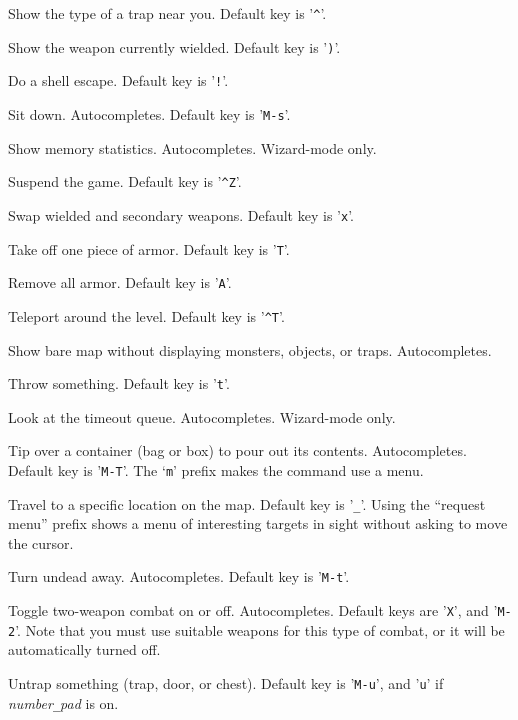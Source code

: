 \item[\tb{\#seetrap}]
Show the type of a trap near you. Default key is '{\tt \^{}}'.
\item[\tb{\#seeweapon}]
Show the weapon currently wielded. Default key is '{\tt )}'.
\item[\tb{\#shell}]
Do a shell escape. Default key is '{\tt !}'.
\item[\tb{\#sit}]
Sit down. Autocompletes. Default key is '{\tt M-s}'.
\item[\tb{\#stats}]
Show memory statistics. Autocompletes. Wizard-mode only.
\item[\tb{\#suspend}]
Suspend the game. Default key is '{\tt \^{}Z}'.
\item[\tb{\#swap}]
Swap wielded and secondary weapons. Default key is '{\tt x}'.
\item[\tb{\#takeoff}]
Take off one piece of armor. Default key is '{\tt T}'.
\item[\tb{\#takeoffall}]
Remove all armor. Default key is '{\tt A}'.
\item[\tb{\#teleport}]
Teleport around the level. Default key is '{\tt \^{}T}'.
\item[\tb{\#terrain}]
Show bare map without displaying monsters, objects, or traps.
Autocompletes.
\item[\tb{\#throw}]
Throw something. Default key is '{\tt t}'.
\item[\tb{\#timeout}]
Look at the timeout queue. Autocompletes. Wizard-mode only.
\item[\tb{\#tip}]
Tip over a container (bag or box) to pour out its contents.
Autocompletes. Default key is '{\tt M-T}'.
The `{\tt m}' prefix makes the command use a menu.
\item[\tb{\#travel}]
Travel to a specific location on the map. Default key is '{\tt _}'.
Using the ``request menu'' prefix shows a menu of interesting targets in sight
without asking to move the cursor.
\item[\tb{\#turn}]
Turn undead away. Autocompletes. Default key is '{\tt M-t}'.
\item[\tb{\#twoweapon}]
Toggle two-weapon combat on or off. Autocompletes. Default keys are '{\tt X}',
and '{\tt M-2}'.
Note that you must
use suitable weapons for this type of combat, or it will
be automatically turned off.
\item[\tb{\#untrap}]
Untrap something (trap, door, or chest). Default key is '{\tt M-u}', and '{\tt u}' if {\it number\verb+_+pad\/} is on.
